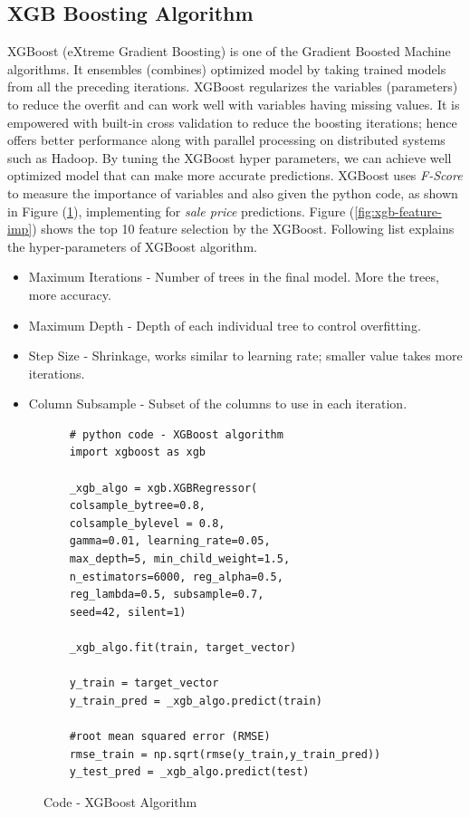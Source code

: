\documentclass[sigconf]{acmart}
\begin{document}
	\subsection{XGB Boosting Algorithm}

	XGBoost (eXtreme Gradient Boosting) is one of the Gradient Boosted Machine algorithms. It ensembles (combines) optimized model by taking trained models from all the preceding iterations. XGBoost regularizes the variables (parameters) to reduce the overfit and can work well with variables having missing values. It is empowered with built-in cross validation to reduce the boosting iterations; hence offers better performance along with parallel processing on distributed systems such as Hadoop. By tuning the XGBoost hyper parameters, we can achieve well optimized model that can make more accurate predictions. XGBoost uses {\em F-Score} to measure the importance of  variables and also given the python code, as shown in Figure (\ref{c:xgb}), implementing for {\em sale price} predictions. Figure (\ref{fig:xgb-feature-imp}) shows the top 10 feature selection by the XGBoost. Following list explains the hyper-parameters of XGBoost algorithm.
	
	\begin{itemize}
		\item  Maximum Iterations - Number of trees in the final model. More the trees, more accuracy.
		\item  Maximum Depth - Depth of each individual tree to control overfitting.
		\item  Step Size - Shrinkage, works similar to learning rate; smaller value takes more iterations.
		\item  Column Subsample - Subset of the columns to use in each iteration.
	\end{itemize}
	
	\begin{figure}[htb]
	\begin{verbatim}
	# python code - XGBoost algorithm
	import xgboost as xgb
		
	_xgb_algo = xgb.XGBRegressor(
	colsample_bytree=0.8,
	colsample_bylevel = 0.8,
	gamma=0.01,	learning_rate=0.05,
	max_depth=5, min_child_weight=1.5,
	n_estimators=6000, reg_alpha=0.5,
	reg_lambda=0.5,	subsample=0.7,
	seed=42, silent=1)
	
	_xgb_algo.fit(train, target_vector)   
	
	y_train = target_vector
	y_train_pred = _xgb_algo.predict(train)
	
	#root mean squared error (RMSE)
	rmse_train = np.sqrt(rmse(y_train,y_train_pred))	
	y_test_pred = _xgb_algo.predict(test)	
	\end{verbatim}
	\caption{Code - XGBoost Algorithm} \label{c:xgb} 
	\end{figure}
	
\end{document}
